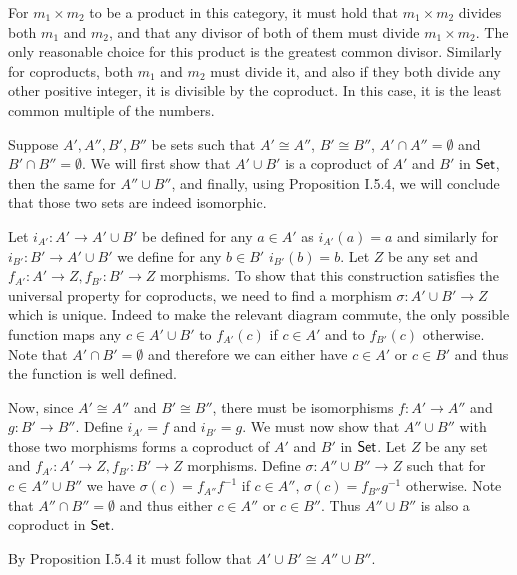 \begin{problem}
\end{problem}

\begin{solution}
	For $m_1 \times m_2$ to be a product in this category, it must hold that $m_1 \times m_2$ divides both $m_1$ and $m_2$, and that any divisor of both of them must divide $m_1 \times m_2$. The only reasonable choice for this product is the greatest common divisor. Similarly for coproducts, both $m_1$ and $m_2$ must divide it, and also if they both divide any other positive integer, it is divisible by the coproduct. In this case, it is the least common multiple of the numbers.
\end{solution}

\begin{problem}
\end{problem}

\begin{solution}
	Suppose $A', A'', B', B''$ be sets such that $A' \cong A''$, $B' \cong B''$, $A' \cap A'' = \emptyset$ and $B' \cap B'' = \emptyset$. We will first show that $A' \cup B'$ is a coproduct of $A'$ and $B'$ in $\mathsf{Set}$, then the same for $A'' \cup B''$, and finally, using Proposition I.5.4, we will conclude that those two sets are indeed isomorphic.
	
	Let $i_{A'}: A' \to A' \cup B'$ be defined for any $a \in A'$ as $i_{A'}(a) = a$ and similarly for $i_{B'}: B' \to A' \cup B'$ we define for any $b \in B'$ $i_{B'}(b) = b$. Let $Z$ be any set and $f_{A'}: A' \to Z, f_{B'}: B' \to Z$ morphisms. To show that this construction satisfies the universal property for coproducts, we need to find a morphism $\sigma: A' \cup B' \to Z$ which is unique. Indeed to make the relevant diagram commute, the only possible function maps any $c \in A' \cup B'$ to $f_{A'}(c)$ if $c \in A'$ and to $f_{B'}(c)$ otherwise. Note that $A' \cap B' = \emptyset$ and therefore we can either have $c \in A'$ or $c \in B'$ and thus the function is well defined.
	
	Now, since $A' \cong A''$ and $B' \cong B''$, there must be isomorphisms $f : A' \to A''$ and $g: B' \to B''$. Define $i_{A'}=f$ and $i_{B'}=g$. We must now show that $A'' \cup B''$ with those two morphisms forms a coproduct of $A'$ and $B'$ in $\mathsf{Set}$. Let $Z$ be any set and $f_{A'}: A' \to Z, f_{B'}: B' \to Z$ morphisms. Define $\sigma: A'' \cup B'' \to Z$ such that for $c \in A'' \cup B''$ we have $\sigma(c)=f_{A''}f^{-1}$ if $c \in A''$, $\sigma(c)=f_{B''}g^{-1}$ otherwise. Note that $A'' \cap B'' = \emptyset$ and thus either $c \in A''$ or $c \in B''$. Thus $A'' \cup B''$ is also a coproduct in $\mathsf{Set}$.
	
	By Proposition I.5.4 it must follow that $A' \cup B' \cong A'' \cup B''$.
\end{solution}

